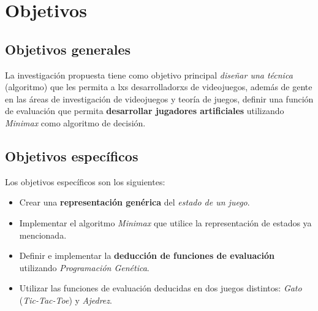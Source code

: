 \section{Objetivos}
  \subsection{Objetivos generales}
    La investigación propuesta tiene como objetivo principal \textit{diseñar una técnica} 
    (algoritmo) que les permita a lxs desarrolladorxs de videojuegos, además de gente en las 
    áreas de investigación de videojuegos y teoría de juegos, definir una función de evaluación que 
    permita \textbf{desarrollar jugadores artificiales} utilizando \textit{Minimax} como algoritmo de decisión.
    
  \subsection{Objetivos específicos}
    Los objetivos específicos son los siguientes:
    
    \begin{itemize}
      \item Crear una \textbf{representación genérica} del \textit{estado de un juego}. 
      \item Implementar el algoritmo \textit{Minimax} que utilice la representación de estados ya 
        mencionada.
      \item Definir e implementar la \textbf{deducción de funciones de evaluación} utilizando 
        \textit{Programación Genética}.
      \item Utilizar las funciones de evaluación deducidas en dos juegos distintos: \textit{Gato} 
        (\textit{Tic-Tac-Toe}) y \textit{Ajedrez}.
    \end{itemize}
